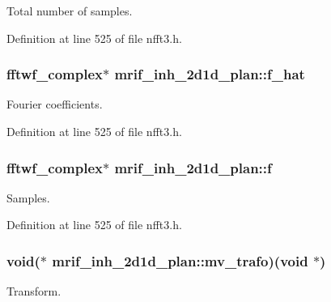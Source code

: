 Total number of samples. 



Definition at line 525 of file nfft3.\-h.

\hypertarget{structmrif__inh__2d1d__plan_a18fb340e9ead654552e45033c81ac637}{
\subsubsection[{f\-\_\-hat}]{\setlength{\rightskip}{0pt plus 5cm}fftwf\-\_\-complex$\ast$ mrif\-\_\-inh\-\_\-2d1d\-\_\-plan\-::f\-\_\-hat}}\label{structmrif__inh__2d1d__plan_a18fb340e9ead654552e45033c81ac637}


Fourier coefficients. 



Definition at line 525 of file nfft3.\-h.

\hypertarget{structmrif__inh__2d1d__plan_a3ab01f8b5f1b1368dbf3d7715ce46997}{
\subsubsection[{f}]{\setlength{\rightskip}{0pt plus 5cm}fftwf\-\_\-complex$\ast$ mrif\-\_\-inh\-\_\-2d1d\-\_\-plan\-::f}}\label{structmrif__inh__2d1d__plan_a3ab01f8b5f1b1368dbf3d7715ce46997}


Samples. 



Definition at line 525 of file nfft3.\-h.

\hypertarget{structmrif__inh__2d1d__plan_acdbe3a414d9c87baba03db3d873b864c}{
\subsubsection[{mv\-\_\-trafo}]{\setlength{\rightskip}{0pt plus 5cm}void($\ast$ mrif\-\_\-inh\-\_\-2d1d\-\_\-plan\-::mv\-\_\-trafo)(void $\ast$)}}\label{structmrif__inh__2d1d__plan_acdbe3a414d9c87baba03db3d873b864c}


Transform. 




